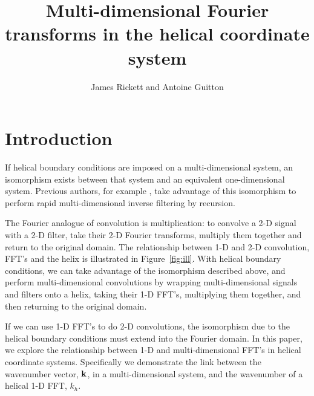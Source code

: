 \def\figdir{./Fig} 
\title{Multi-dimensional Fourier transforms in the helical coordinate 
system}  

\author{James Rickett and Antoine Guitton}


\section{Introduction}

If helical boundary conditions \cite{geofizhelix} are imposed on a
multi-dimensional system, an isomorphism exists between that system
and an equivalent one-dimensional system.  
Previous authors, for example , take advantage of
this isomorphism to perform rapid multi-dimensional inverse filtering
by recursion. 

\par
The Fourier analogue of convolution is multiplication: to convolve a
2-D signal with a 2-D filter, take their 2-D Fourier transforms,
multiply them together and return to the original domain.
The relationship between 1-D and 2-D convolution, FFT's and the helix
is illustrated in Figure~\ref{fig:ill}.
With helical boundary conditions, we can take advantage of the
isomorphism described above, and perform multi-dimensional
convolutions by wrapping multi-dimensional signals and filters onto a
helix, taking their 1-D FFT's, multiplying them together, and then
returning to the original domain.

\par
If we can use 1-D FFT's to do 2-D convolutions, the isomorphism due to
the helical boundary conditions must extend into the Fourier domain.  
In this paper, we explore the relationship between 1-D and
multi-dimensional FFT's in helical coordinate systems.  Specifically
we demonstrate the link between the wavenumber vector, ${\bf k}$, in a 
multi-dimensional system, and the wavenumber of a helical 1-D FFT,
$k_h$. 

